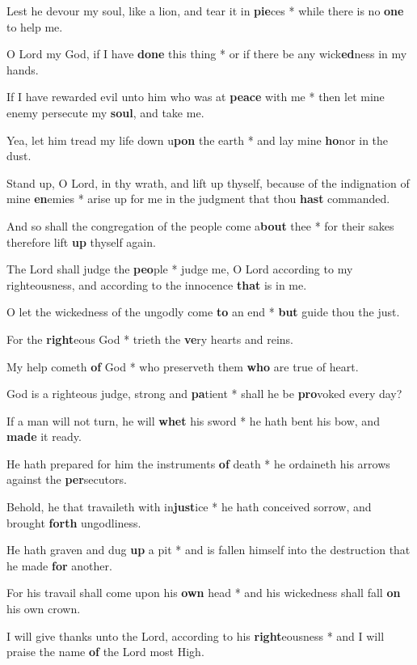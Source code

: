 \begin{multicols}{2}
	Lest he devour my soul, like a lion, and tear it in \textbf{pie}ces * while there is no \textbf{one} to help me.
	
	O Lord my God, if I have \textbf{done} this thing * or if there be any wick\textbf{ed}ness in my hands.
	
	If I have rewarded evil unto him who was at \textbf{peace} with me * then let mine enemy persecute my \textbf{soul}, and take me.
	
	Yea, let him tread my life down u\textbf{pon} the earth * and lay mine \textbf{ho}nor in the dust.
	
	Stand up, O Lord, in thy wrath, and lift up thyself, because of the indignation of mine \textbf{en}emies * arise up for me in the judgment that thou \textbf{hast} commanded.
	
	And so shall the congregation of the people come a\textbf{bout} thee * for their sakes therefore lift \textbf{up} thyself again.
	
	The Lord shall judge the \textbf{peo}ple * judge me, O Lord according to my righteousness, and according to the innocence \textbf{that} is in me.
	
	O let the wickedness of the ungodly come \textbf{to} an end * \textbf{but} guide thou the just.
	
	For the \textbf{right}eous God * trieth the \textbf{ve}ry hearts and reins.
	
	My help cometh \textbf{of} God * who preserveth them \textbf{who} are true of heart.
	
	God is a righteous judge, strong and \textbf{pa}tient * shall he be \textbf{pro}voked every day?
	
	If a man will not turn, he will \textbf{whet} his sword * he hath bent his bow, and \textbf{made} it ready.
	
	He hath prepared for him the instruments \textbf{of} death * he ordaineth his arrows against the \textbf{per}secutors.
	
	Behold, he that travaileth with in\textbf{just}ice * he hath conceived sorrow, and brought \textbf{forth} ungodliness.
	
	He hath graven and dug \textbf{up} a pit * and is fallen himself into the destruction that he made \textbf{for} another.
	
	For his travail shall come upon his \textbf{own} head * and his wickedness shall fall \textbf{on} his own crown.
	
	I will give thanks unto the Lord, according to his \textbf{right}eousness * and I will praise the name \textbf{of} the Lord most High.
\end{multicols}